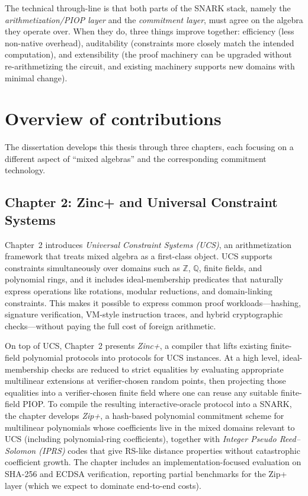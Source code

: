 The technical through-line is that both parts of the SNARK stack, namely the \emph{arithmetization/PIOP layer} and the \emph{commitment layer}, must agree on the algebra they operate over. When they do, three things improve together: efficiency (less non-native overhead), auditability (constraints more closely match the intended computation), and extensibility (the proof machinery can be upgraded without re-arithmetizing the circuit, and existing machinery supports new domains with minimal change).

\section{Overview of contributions}

The dissertation develops this thesis through three chapters, each focusing on a different aspect of ``mixed algebras'' and the corresponding commitment technology.

\subsection*{Chapter 2: Zinc+ and Universal Constraint Systems}

Chapter~2 introduces \emph{Universal Constraint Systems (UCS)}, an arithmetization framework that treats mixed algebra as a first-class object. UCS supports constraints simultaneously over domains such as $\mathbb{Z}$, $\mathbb{Q}$, finite fields, and polynomial rings, and it includes ideal-membership predicates that naturally express operations like rotations, modular reductions, and domain-linking constraints. This makes it possible to express common proof workloads---hashing, signature verification, VM-style instruction traces, and hybrid cryptographic checks---without paying the full cost of foreign arithmetic.

On top of UCS, Chapter~2 presents \emph{Zinc+}, a compiler that lifts existing finite-field polynomial protocols into protocols for UCS instances.
At a high level, ideal-membership checks are reduced to strict equalities by evaluating appropriate multilinear extensions at verifier-chosen random points, then projecting those equalities into a verifier-chosen finite field where one can reuse any suitable finite-field PIOP. To compile the resulting interactive-oracle protocol into a SNARK, the chapter develops \emph{Zip+}, a hash-based polynomial commitment scheme for multilinear polynomials whose coefficients live in the mixed domains relevant to UCS (including polynomial-ring coefficients), together with \emph{Integer Pseudo Reed--Solomon (IPRS)} codes that give RS-like distance properties without catastrophic coefficient growth. The chapter includes an implementation-focused evaluation on SHA-256 and ECDSA verification, reporting partial benchmarks for the Zip+ layer (which we expect to dominate end-to-end costs).

